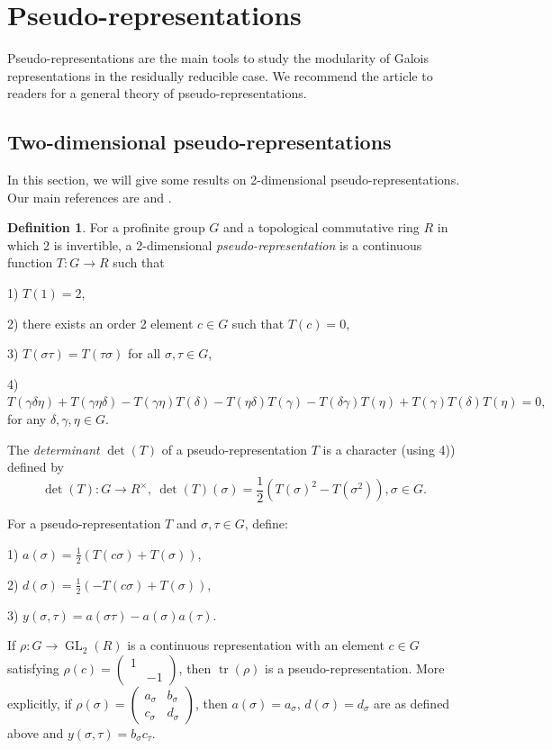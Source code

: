 \documentclass[12pt]{amsart}
\theoremstyle{plain}
\theoremstyle{definition}
\newtheorem{defn}[thm]{Definition}
\theoremstyle{remark}
\begin{document}
\section{Pseudo-representations}

Pseudo-representations are the main tools to study the modularity of Galois representations in the residually reducible case. We recommend the article \cite{bellaiche2009families} to readers for a general theory of pseudo-representations.

\subsection{Two-dimensional pseudo-representations}
In this section, we will give some results on 2-dimensional pseudo-representations. Our main references are \cite{skinner1999residually} and \cite{pan2022fontaine}. 


\begin{defn} \label{pseudo}
	For a profinite group $G$ and a topological commutative ring $R$ in which 2 is invertible, a 2-dimensional \textit{pseudo-representation} is a continuous function $T: G \to R$ such that 
	
	1) $T(1)=2$,
	
	2) there exists an order 2 element $c \in G$ such that $T(c)=0$,
	
	3) $T(\sigma \tau)=T(\tau \sigma)$ for all $ \sigma, \tau \in G$,
	
	4) $T(\gamma \delta \eta)+T(\gamma \eta \delta)-T(\gamma \eta)T(\delta)-T(\eta \delta)T(\gamma)-T(\delta \gamma)T(\eta)+T(\gamma)T(\delta)T(\eta)=0,$
	for any $\delta, \gamma,\eta\in G$.
	
	The \textit{determinant} $\operatorname{det}(T)$ of a pseudo-representation $T$ is a character (using 4)) defined by $$ \operatorname{det}(T): G \to R^\times, ~
	\operatorname{det}(T)(\sigma)=\frac{1}{2}(T(\sigma)^2-T(\sigma^2)), \sigma \in G.$$
	
	
	
	For a pseudo-representation $T$ and $\sigma, \tau \in G$, define:
	
	1) $a(\sigma)=\frac{1}{2}(T(c\sigma)+T(\sigma))$,
	
	2) $d(\sigma)=\frac{1}{2}(-T(c\sigma)+T(\sigma))$,
	
	3) $y(\sigma, \tau)=a(\sigma \tau)-a(\sigma)a(\tau).$
\end{defn}


If $\rho: G \to \operatorname{GL}_2(R)$ is a continuous representation with an element $c \in G$ satisfying $\rho(c)=\begin{pmatrix}
	1 & ~\\
	~& -1
\end{pmatrix}
$, then $\operatorname{tr}(\rho)$ is a pseudo-representation. More explicitly, if $\rho(\sigma)=\begin{pmatrix}
	a_\sigma & b_\sigma\\
	c_\sigma& d_\sigma
\end{pmatrix}$, then $a(\sigma)=a_\sigma$, $d(\sigma)=d_\sigma$ are as defined above and $y(\sigma, \tau)=b_\sigma c_\tau$.
\end{document}
